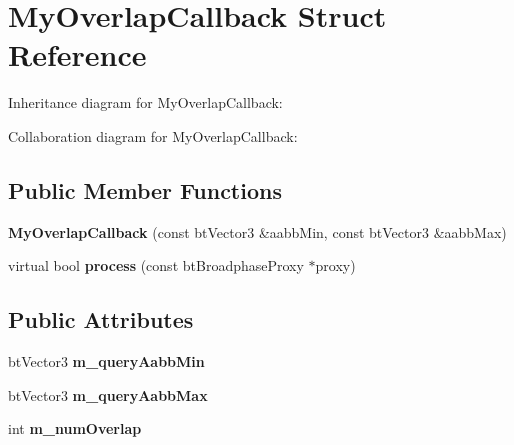 \hypertarget{struct_my_overlap_callback}{\section{My\+Overlap\+Callback Struct Reference}
\label{struct_my_overlap_callback}
}


Inheritance diagram for My\+Overlap\+Callback\+:


Collaboration diagram for My\+Overlap\+Callback\+:
\subsection*{Public Member Functions}
\begin{DoxyCompactItemize}
\item 
\hypertarget{struct_my_overlap_callback_aab0ec53437855bd51e152d90c87bc308}{{\bfseries My\+Overlap\+Callback} (const bt\+Vector3 \&aabb\+Min, const bt\+Vector3 \&aabb\+Max)}\label{struct_my_overlap_callback_aab0ec53437855bd51e152d90c87bc308}

\item 
\hypertarget{struct_my_overlap_callback_a800de19342d0fe5b72e75e1f52c4f6c0}{virtual bool {\bfseries process} (const bt\+Broadphase\+Proxy $\ast$proxy)}\label{struct_my_overlap_callback_a800de19342d0fe5b72e75e1f52c4f6c0}

\end{DoxyCompactItemize}
\subsection*{Public Attributes}
\begin{DoxyCompactItemize}
\item 
\hypertarget{struct_my_overlap_callback_aef47a99d3560e8e3c9fc9acdf47446de}{bt\+Vector3 {\bfseries m\+\_\+query\+Aabb\+Min}}\label{struct_my_overlap_callback_aef47a99d3560e8e3c9fc9acdf47446de}

\item 
\hypertarget{struct_my_overlap_callback_a7a4eef43032ad6c7762059a07a1ed463}{bt\+Vector3 {\bfseries m\+\_\+query\+Aabb\+Max}}\label{struct_my_overlap_callback_a7a4eef43032ad6c7762059a07a1ed463}

\item 
\hypertarget{struct_my_overlap_callback_aa956303c4fc43b1598be062437cf9595}{int {\bfseries m\+\_\+num\+Overlap}}\label{struct_my_overlap_callback_aa956303c4fc43b1598be062437cf9595}

\end{DoxyCompactItemize}


